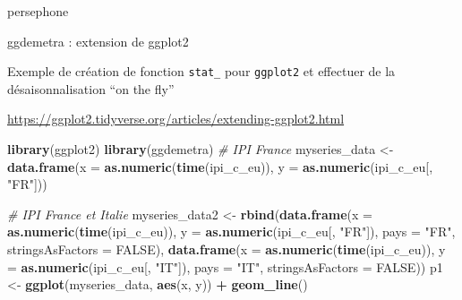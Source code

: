\documentclass[10pt,xcolor=table,color={dvipsnames,usenames},ignorenonframetext,usepdftitle=false,french]{beamer}
\newenvironment{Shaded}{\begin{snugshade}}{\end{snugshade}}
\newcommand{\CommentTok}[1]{\textcolor[rgb]{0.56,0.35,0.01}{\textit{#1}}}
\newcommand{\DataTypeTok}[1]{\textcolor[rgb]{0.13,0.29,0.53}{#1}}
\newcommand{\KeywordTok}[1]{\textcolor[rgb]{0.13,0.29,0.53}{\textbf{#1}}}
\newcommand{\NormalTok}[1]{#1}
\newcommand{\OperatorTok}[1]{\textcolor[rgb]{0.81,0.36,0.00}{\textbf{#1}}}
\newcommand{\OtherTok}[1]{\textcolor[rgb]{0.56,0.35,0.01}{#1}}
\newcommand{\StringTok}[1]{\textcolor[rgb]{0.31,0.60,0.02}{#1}}
\begin{document}
\begin{frame}{persephone}
\protect\hypertarget{persephone}{}


\end{frame}

\begin{frame}[fragile]{ggdemetra : extension de ggplot2}
\protect\hypertarget{ggdemetra-extension-de-ggplot2}{}

Exemple de création de fonction \texttt{stat\_} pour \texttt{ggplot2} et
effectuer de la désaisonnalisation ``on the fly''

\url{https://ggplot2.tidyverse.org/articles/extending-ggplot2.html}

\footnotesize

\begin{Shaded}
\begin{Highlighting}[]
\KeywordTok{library}\NormalTok{(ggplot2)}
\KeywordTok{library}\NormalTok{(ggdemetra)}
\CommentTok{# IPI France}
\NormalTok{myseries_data <-}\StringTok{ }\KeywordTok{data.frame}\NormalTok{(}\DataTypeTok{x =} \KeywordTok{as.numeric}\NormalTok{(}\KeywordTok{time}\NormalTok{(ipi_c_eu)),}
                            \DataTypeTok{y =} \KeywordTok{as.numeric}\NormalTok{(ipi_c_eu[, }\StringTok{"FR"}\NormalTok{]))}

\CommentTok{# IPI France et Italie}
\NormalTok{myseries_data2 <-}\StringTok{ }\KeywordTok{rbind}\NormalTok{(}\KeywordTok{data.frame}\NormalTok{(}\DataTypeTok{x =} \KeywordTok{as.numeric}\NormalTok{(}\KeywordTok{time}\NormalTok{(ipi_c_eu)),}
                                   \DataTypeTok{y =} \KeywordTok{as.numeric}\NormalTok{(ipi_c_eu[, }\StringTok{"FR"}\NormalTok{]),}
                                   \DataTypeTok{pays =} \StringTok{"FR"}\NormalTok{, }\DataTypeTok{stringsAsFactors =} \OtherTok{FALSE}\NormalTok{),}
                        \KeywordTok{data.frame}\NormalTok{(}\DataTypeTok{x =} \KeywordTok{as.numeric}\NormalTok{(}\KeywordTok{time}\NormalTok{(ipi_c_eu)),}
                                   \DataTypeTok{y =} \KeywordTok{as.numeric}\NormalTok{(ipi_c_eu[, }\StringTok{"IT"}\NormalTok{]),}
                                   \DataTypeTok{pays =} \StringTok{"IT"}\NormalTok{, }\DataTypeTok{stringsAsFactors =} \OtherTok{FALSE}\NormalTok{))}
\NormalTok{p1 <-}\StringTok{ }\KeywordTok{ggplot}\NormalTok{(myseries_data, }\KeywordTok{aes}\NormalTok{(x, y)) }\OperatorTok{+}\StringTok{ }
\StringTok{  }\KeywordTok{geom_line}\NormalTok{()}
\end{Highlighting}
\end{Shaded}

\end{frame}
\end{document}
